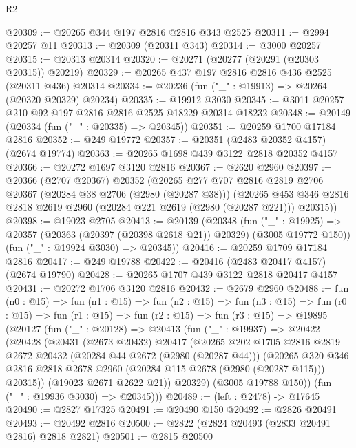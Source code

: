 \begin{lexlean}{R2}
\begin{coremodule}
@20309 := @20265 @344 @197 @2816 @2816 @343 @2525
@20311 := @2994 @20257 @11
@20313 := @20309 (@20311 @343)
@20314 := @3000 @20257
@20315 := @20313 @20314
@20320 := @20271 (@20277 (@20291 (@20303 @20315)) @20219)
@20329 := @20265 @437 @197 @2816 @2816 @436 @2525 (@20311 @436) @20314
@20334 := @20236 (fun ("_" : @19913) => @20264 (@20320 @20329) @20234)
@20335 := @19912 @3030
@20345 := @3011 @20257 @210 @92 @197 @2816 @2816 @2525 @18229 @20314 @18232
@20348 := @20149 (@20334 (fun ("_" : @20335) => @20345))
@20351 := @20259 @1700 @17184 @2816
@20352 := @249 @19772
@20357 := @20351 (@2483 @20352 @4157) (@2674 @19774)
@20363 := @20265 @1698 @439 @3122 @2818 @20352 @4157
@20366 := @20272 @1697 @3120 @2816
@20367 := @2620 @2960
@20397 := @20366
    (@2707 @20367)
    @20352
    (@20265
      @277
      @707
      @2816
      @2819
      @2706
      @20367
      (@20284 @38 @2706 (@2980 (@20287 @38)))
      (@20265 @453 @346 @2816 @2818 @2619 @2960 (@20284 @221 @2619 (@2980 (@20287 @221))) @20315))
@20398 := @19023 @2705
@20413 := @20139
    (@20348
      (fun ("_" : @19925) => @20357 (@20363 (@20397 (@20398 @2618 @21)) @20329) (@3005 @19772 @150))
      (fun ("_" : @19924 @3030) => @20345))
@20416 := @20259 @1709 @17184 @2816
@20417 := @249 @19788
@20422 := @20416 (@2483 @20417 @4157) (@2674 @19790)
@20428 := @20265 @1707 @439 @3122 @2818 @20417 @4157
@20431 := @20272 @1706 @3120 @2816
@20432 := @2679 @2960
@20488 := fun (n0 : @15) =>
  fun (n1 : @15) =>
  fun (n2 : @15) =>
  fun (n3 : @15) =>
  fun (r0 : @15) =>
  fun (r1 : @15) =>
  fun (r2 : @15) =>
  fun (r3 : @15) =>
  @19895
    (@20127
      (fun ("_" : @20128) =>
      @20413
        (fun ("_" : @19937) =>
        @20422
          (@20428
            (@20431
              (@2673 @20432)
              @20417
              (@20265
                @202
                @1705
                @2816
                @2819
                @2672
                @20432
                (@20284 @44 @2672 (@2980 (@20287 @44)))
                (@20265
                  @320
                  @346
                  @2816
                  @2818
                  @2678
                  @2960
                  (@20284 @115 @2678 (@2980 (@20287 @115)))
                  @20315))
              (@19023 @2671 @2622 @21))
            @20329)
          (@3005 @19788 @150))
        (fun ("_" : @19936 @3030) => @20345)))
@20489 := (left : @2478) -> @17645
@20490 := @2827 @17325
@20491 := @20490 @150
@20492 := @2826 @20491
@20493 := @20492 @2816
@20500 := @2822 (@2824 @20493 (@2833 @20491 @2816) @2818 @2821)
@20501 := @2815 @20500

\end{coremodule}
\end{lexlean}
